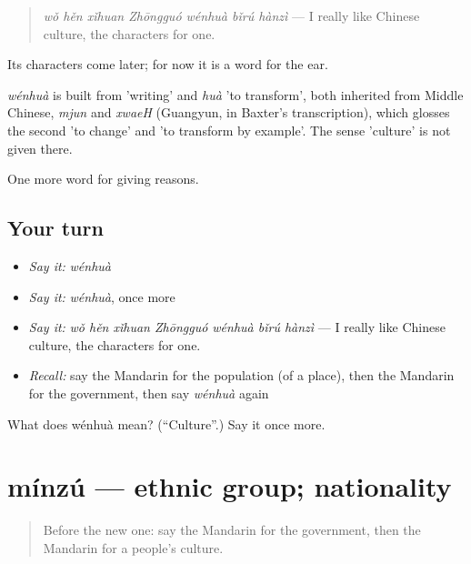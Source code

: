 \begin{quote}
\emph{wǒ hěn xǐhuan Zhōngguó wénhuà bǐrú hànzì} — I really like Chinese culture, the characters for one.
\end{quote}

Its characters come later; for now it is a word for the ear.

\begin{cousinweb}
\emph{wénhuà} is built from  'writing' and \emph{huà} 'to transform', both inherited from Middle Chinese, \emph{mjun} and \emph{xwaeH} (Guangyun, in Baxter's transcription), which glosses the second 'to change' and 'to transform by example'. The sense 'culture' is not given there.
\end{cousinweb}

\begin{grammarlens}[title={What you've built}]
One more word for giving reasons.
\end{grammarlens}

\subsection*{Your turn}
\begin{itemize}
\raggedright
  \item \emph{Say it:} \emph{wénhuà}
  \item \emph{Say it:} \emph{wénhuà}, once more
  \item \emph{Say it:} \emph{wǒ hěn xǐhuan Zhōngguó wénhuà bǐrú hànzì} — I really like Chinese culture, the characters for one.
  \item \emph{Recall:} say the Mandarin for the population (of a place), then the Mandarin for the government, then say \emph{wénhuà} again
\end{itemize}

\begin{tcolorbox}[breakable,colback=teal!4,colframe=teal!35!black,title={Before you move on}]
What does wénhuà mean? (\textquotedblleft{}Culture\textquotedblright{}.) Say it once more.
\end{tcolorbox}
\section[mínzú]{mínzú — ethnic group; nationality}

\label{lesson:ZH-C374-minzu}



\begin{quote}
Before the new one: say the Mandarin for the government, then the Mandarin for a people's culture.
\end{quote}


